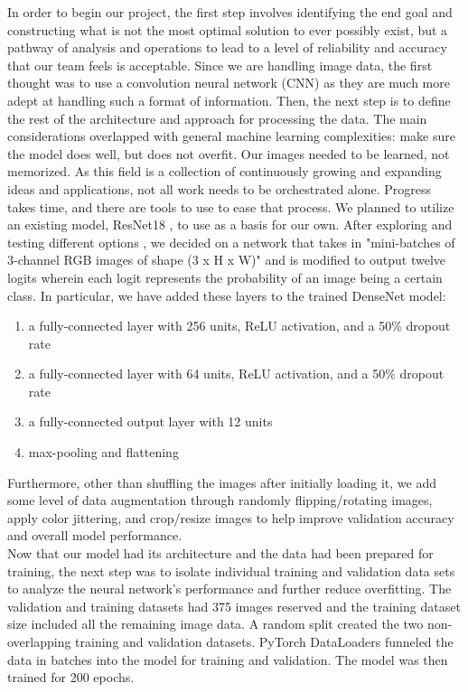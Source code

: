\documentclass[10pt]{article}
\begin{document}
\indent In order to begin our project, the first step involves identifying the end goal and constructing what is not the most optimal solution to ever possibly exist, but a pathway of analysis and operations to lead to a level of reliability and accuracy that our team feels is acceptable. Since we are handling image data, the first thought was to use a convolution neural network (CNN) as they are much more adept at handling such a format of information. Then, the next step is to define the rest of the architecture and approach for processing the data. The main considerations overlapped with general machine learning complexities: make sure the model does well, but does not overfit. Our images needed to be learned, not memorized. 
\newline
\indent As this field is a collection of continuously growing and expanding ideas and applications, not all work needs to be orchestrated alone. Progress takes time, and there are tools to use to ease that process. We planned to utilize an existing model, ResNet18 \cite{resnet}, to use as a basis for our own. After exploring and testing different options \cite{ben}, we decided on a network that takes in "mini-batches of 3-channel RGB images of shape (3 x H x W)" \cite{densenet} and is modified to output twelve logits wherein each logit represents the probability of an image being a certain class. In particular, we have added these layers \cite{ridnik2023mldecoder} to the trained DenseNet model: 
\begin{enumerate}
\item a fully-connected layer with 256 units, ReLU activation, and a 50\% dropout rate
\item a fully-connected layer with 64 units, ReLU activation, and a 50\% dropout rate
\item a fully-connected output layer with 12 units
\item max-pooling and flattening
\end{enumerate}
\indent Furthermore, other than shuffling the images after initially loading it, we add some level of data augmentation through randomly flipping/rotating images, apply color jittering, and crop/resize images to help improve validation accuracy and overall model performance.
\\
\indent Now that our model had its architecture and the data had been prepared for training, the next step was to isolate individual training and validation data sets to analyze the neural network’s performance and further reduce overfitting. The validation and training datasets had 375 images reserved and the training dataset size included all the remaining image data. A random split created the two non-overlapping training and validation datasets. PyTorch DataLoaders funneled the data in batches into the model for training and validation. The model was then trained for 200 epochs.
\end{document}
